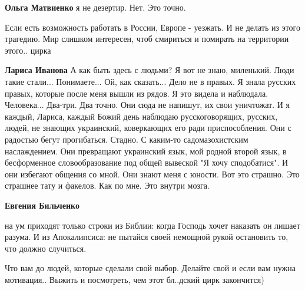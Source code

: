\begin{itemize}
\begin{itemize}
\textbf{Ольга Матвиенко} я не дезертир. Нет. Это точно.
\end{itemize}

 

Если есть возможность работать в России, Европе - уезжать. И не делать из этого
трагедию. Мир слишком интересен, чтоб смириться и помирать на территории
этого.. цирка

\begin{itemize}
 
\textbf{Лариса Иванова} А как быть здесь с людьми? Я вот не знаю, миленький.
Люди такие стали... Понимаете... Ой, как сказать... Дело не в правых. Я знала
русских правых, которые после меня вышли из рядов. Я это видела и наблюдала.
Человека... Два-три. Два точно. Они сюда не напишут, их свои уничтожат. И я
каждый, Лариса, каждый Божий день наблюдаю русскоговорящих, русских, людей, не
знающих украинский, коверкающих его ради приспособления. Они с радостью бегут
прогибаться. Стадно. С каким-то садомазохистским наслаждением. Они превращают
украинский язык, мой родной второй язык, в бесформенное словообразование под
общей вывеской "Я хочу сподобатися". И они избегают общения со мной. Они знают
меня с юности. Вот это страшно. Это страшнее тату и факелов. Как по мне. Это
внутри мозга.

 
\textbf{Евгения Бильченко} 

на ум приходят только строки из Библии: когда Господь хочет наказать он лишает
разума. И из Апокалипсиса: не пытайся своей немощной рукой остановить то, что
должно случиться.

Что вам до людей, которые сделали свой выбор. Делайте свой и если вам нужна
мотивация.. Выжить и посмотреть, чем этот бл..дский цирк закончится)



\end{itemize}
\end{itemize}
